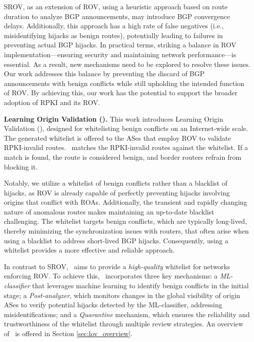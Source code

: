 SROV, as an extension of ROV, using a heuristic approach based on route duration to analyze BGP announcements, may introduce BGP convergence delays.
Additionally, this approach has a high rate of false negatives (i.e., misidentifying hijacks as benign routes), potentially leading to failures in preventing actual BGP hijacks. In practical terms, striking a balance in ROV implementation—ensuring security and maintaining network performance—is essential.
As a result, new mechanisms need to be explored to resolve these issues.
Our work addresses this balance by preventing the discard of BGP announcements with benign conflicts while still upholding the intended function of ROV. By achieving this, our work has the potential to support the broader adoption of RPKI and its ROV.

\textbf{Learning Origin Validation (\lov).}
This work introduces Learning Origin Validation (\lov), designed for whitelisting benign conflicts on an Internet-wide scale. The generated whitelist is offered to the ASes that employ ROV to validate RPKI-invalid routes. \lov\ matches the RPKI-invalid routes against the whitelist. If a match is found, the route is considered benign, and border routers refrain from blocking it.

Notably, we utilize a whitelist of benign conflicts rather than a blacklist of hijacks, as ROV is already capable of perfectly preventing hijacks involving origins that conflict with ROAs.
Additionally, the transient and rapidly changing nature of anomalous routes makes maintaining an up-to-date blacklist challenging.
The whitelist targets benign conflicts, which are typically long-lived, thereby minimizing the synchronization issues with routers, that often arise when using a blacklist to address short-lived BGP hijacks.
Consequently, using a whitelist provides a more effective and reliable approach.

In contrast to SROV, \lov\ aims to provide a \textit{high-quality} whitelist for networks enforcing ROV. To achieve this, \lov\ incorporates three key mechanisms: a \textit{ML-classifier} that leverages machine learning to identify benign conflicts in the initial stage; a \textit{Post-analyzer}, which monitors changes in the global visibility of origin ASes to verify potential hijacks detected by the ML-classifier, addressing misidentifications; and a \textit{Quarantine} mechanism, which ensures the reliability and trustworthiness of the whitelist through multiple review strategies. An overview of \lov\ is offered in Section \ref{sec:lov_overview}.

